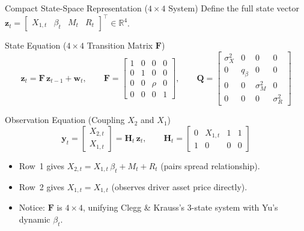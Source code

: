 \documentclass[10pt, aspectratio=169]{beamer}
\begin{document}
\begin{frame}{Compact State-Space Representation ($4 \times 4$ System)}
  Define the full state vector
  $\bm{z}_t = \begin{bmatrix}X_{1,t} & \beta_t & M_t & R_t\end{bmatrix}^\top \in \mathbb{R}^4$.
  \vspace{4pt}
  \begin{block}{State Equation ($4 \times 4$ Transition Matrix $\bm{F}$)}
    \[
      \bm{z}_t = \bm{F}\,\bm{z}_{t-1} + \bm{w}_t,\qquad
      \bm{F} = \begin{bmatrix}
        1 & 0 & 0 & 0\\
        0 & 1 & 0 & 0\\
        0 & 0 & \rho & 0\\
        0 & 0 & 0 & 1
      \end{bmatrix},\qquad
      \bm{Q} = \begin{bmatrix}
        \sigma_X^2 & 0 & 0 & 0\\
        0 & q_\beta & 0 & 0\\
        0 & 0 & \sigma_M^2 & 0\\
        0 & 0 & 0 & \sigma_R^2
      \end{bmatrix}
    \]
  \end{block}
  \begin{block}{Observation Equation (Coupling $X_2$ and $X_1$)}
    \[
      \bm{y}_t = \begin{bmatrix} X_{2,t} \\ X_{1,t} \end{bmatrix} = \bm{H}_t\,\bm{z}_t,\qquad
      \bm{H}_t = \begin{bmatrix}
        0 & X_{1,t} & 1 & 1\\[2pt]
        1 & 0 & 0 & 0
      \end{bmatrix}
    \]
  \end{block}
  \vspace{2pt}
  \begin{itemize}
    \item Row~1 gives $X_{2,t} = X_{1,t}\,\beta_t + M_t + R_t$ (pairs spread relationship).
    \item Row~2 gives $X_{1,t} = X_{1,t}$ (observes driver asset price directly).
    \item Notice: $\bm{F}$ is \textbf{$4 \times 4$}, unifying Clegg \& Krauss's 3-state system with Yu's dynamic $\beta_t$.
  \end{itemize}
\end{frame}
\end{document}
